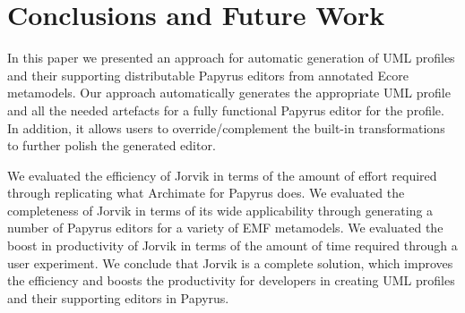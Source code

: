 \section{Conclusions and Future Work}
\label{sec:future}
In this paper we presented an approach for automatic generation of UML profiles and their supporting distributable Papyrus editors from annotated Ecore metamodels. 
Our approach automatically generates the appropriate UML profile and all the needed artefacts for a fully functional Papyrus editor for the profile. 
In addition, it allows users to override/complement the built-in transformations to further polish the generated editor.

We evaluated the efficiency of Jorvik in terms of the amount of effort required through replicating what Archimate for Papyrus does. 
We evaluated the completeness of Jorvik in terms of its wide applicability through generating a number of Papyrus editors for a variety of EMF metamodels.
We evaluated the boost in productivity of Jorvik in terms of the amount of time required through a user experiment.
We conclude that Jorvik is a complete solution, which improves the efficiency and boosts the productivity for developers in creating UML profiles and their supporting editors in Papyrus.


